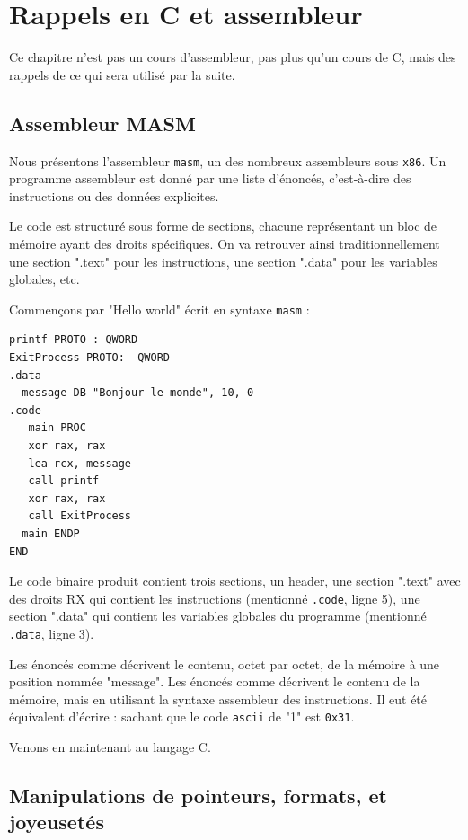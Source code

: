 \documentclass{book}
\newcommand{\code}[1]{\texttt{#1}}
\newcommand{\xquatre}{{\tt x86}\xspace}
\begin{document}
\chapter{Rappels en C et assembleur}

Ce chapitre n'est pas un cours d'assembleur, pas plus qu'un cours de C, mais des rappels de ce qui sera utilisé par la suite. 

\section{Assembleur MASM}

Nous présentons l'assembleur {\tt masm}, un des nombreux assembleurs sous \xquatre. Un programme assembleur est donné par une liste d'énoncés, c'est-à-dire des instructions ou des données explicites. 

Le code est structuré sous forme de sections, chacune représentant un bloc de mémoire ayant des droits spécifiques. On va retrouver ainsi traditionnellement une section ".text" pour les instructions, une section ".data" pour les variables globales, etc. 

Commençons par "Hello world" écrit en syntaxe {\tt masm} :

\begin{verbatim}
printf PROTO : QWORD
ExitProcess PROTO:  QWORD
.data 
  message DB "Bonjour le monde", 10, 0
.code 
   main PROC
   xor rax, rax
   lea rcx, message
   call printf
   xor rax, rax
   call ExitProcess
  main ENDP
END
\end{verbatim}

Le code binaire produit contient trois sections, un header, une section ".text" avec des droits RX qui contient les instructions (mentionné \code{.code}, ligne 5), une section ".data" qui contient les variables globales du programme (mentionné \code{.data}, ligne 3). 

Les énoncés comme 
 décrivent le contenu, octet par octet, de la mémoire à une position nommée "message". 
Les énoncés comme  décrivent le contenu de la mémoire, mais en utilisant la syntaxe assembleur des instructions. Il eut été équivalent d'écrire : 
sachant que le code {\tt ascii} de "1" est \code{0x31}.  

Venons en maintenant au langage C. 

\section{Manipulations de pointeurs, formats, et joyeusetés}
\end{document}
